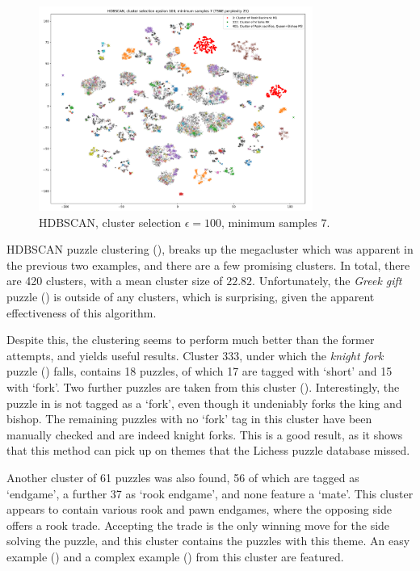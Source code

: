 \begin{figure}[H]
  \centering
  \includegraphics[width=0.8\textwidth]{project/img/tsne/hdbscan_2_25.png}
  \caption{HDBSCAN, cluster selection $\epsilon=100$, minimum samples $7$.}
  \label{tsne3}
\end{figure}

HDBSCAN puzzle clustering (), breaks up the megacluster which was
apparent in the previous two examples, and there are a few promising clusters.
In total, there are 420 clusters, with a mean cluster size of $22.82$.
Unfortunately, the \emph{Greek gift} puzzle () is outside of any
clusters, which is surprising, given the apparent effectiveness of this
algorithm.

Despite this, the clustering seems to perform much better than the former
attempts, and yields useful results. Cluster 333, under which the \emph{knight
fork} puzzle () falls, contains 18 puzzles, of which 17 are
tagged with `short' and 15 with `fork'. Two further puzzles are taken from this
cluster (). Interestingly, the puzzle in  is
not tagged as a `fork', even though it undeniably forks the king and bishop.
The remaining puzzles with no `fork' tag in this cluster have been manually
checked and are indeed knight forks. This is a good result, as it shows that
this method can pick up on themes that the Lichess puzzle database missed.

Another cluster of 61 puzzles was also found, 56 of which are tagged as
`endgame', a further 37 as `rook endgame', and none feature a `mate'. This
cluster appears to contain various rook and pawn endgames, where the opposing
side offers a rook trade. Accepting the trade is the only winning move for the
side solving the puzzle, and this cluster contains the puzzles with this theme.
An easy example () and a complex example () from
this cluster are featured.

